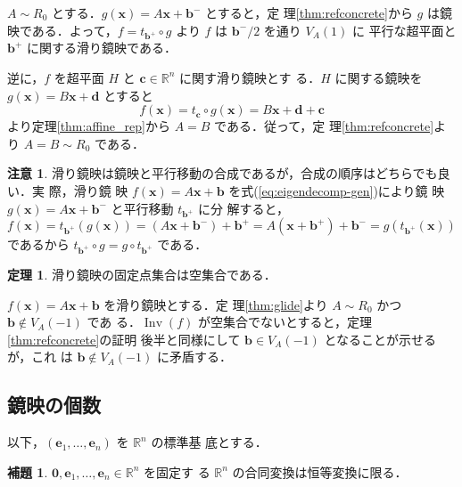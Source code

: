 \documentclass[11pt, uplatex, dvipdfmx, titlepage]{jsarticle}
\makeatletter
\DeclareMathOperator{\Inv}{Inv}
\renewenvironment{proof}[1][\proofname]{\par
  \pushQED{\qed}%
  \normalfont \topsep6\p@\@plus6\p@\relax
  \trivlist
  \item[\hskip\labelsep
         \bfseries
    {#1}]\ignorespaces
}{%
  \popQED\endtrivlist\@endpefalse
}
\theoremstyle{definition}
\newtheorem{theorem}{定理}[section]
\newtheorem{lemma}{補題}[section]
\renewcommand{\proofname}{\textbf{証明}}
\newtheorem*{remark}{注意}
\makeatother
\begin{document}
\begin{proof}
  $A \sim R_0$ とする．$g(\bm{x}) = A\bm{x} + \bm{b}^{-}$ とすると，定
  理\ref{thm:refconcrete}から $g$ は鏡映である．よって，$f =
  t_{\bm{b}^{+}} \circ g$ より $f$ は $\bm{b}^{-}/2$ を通り $V_A(1)$ に
  平行な超平面と $\bm{b}^{+}$ に関する滑り鏡映である．

  逆に，$f$ を超平面 $H$ と $\bm{c} \in \mathbb{R}^n$ に関す滑り鏡映とす
  る．$H$ に関する鏡映を $g(\bm{x}) = B\bm{x} + \bm{d}$ とすると
  \[
    f(\bm{x}) = t_{\bm{c}}\circ g(\bm{x}) = B\bm{x} + \bm{d} + \bm{c}
  \]
  より定理\ref{thm:affine_rep}から $A=B$ である．従って，定
  理\ref{thm:refconcrete}より $A =B\sim R_0$ である．
\end{proof}

\begin{remark}
  滑り鏡映は鏡映と平行移動の合成であるが，合成の順序はどちらでも良い．実
  際，滑り鏡
  映 $f(\bm{x})=A\bm{x}+\bm{b}$ を式(\ref{eq:eigendecomp-gen})により鏡
  映 $g(\bm{x}) = A\bm{x} + \bm{b}^{-}$ と平行移動 $t_{\bm{b}^{+}}$ に分
  解すると，
  \[
    f(\bm{x}) = t_{\bm{b}^{+}} \left( g(\bm{x}) \right)= \left(A\bm{x} + \bm{b}^{-}\right) + \bm{b}^{+}
    = A\left(\bm{x}+\bm{b}^{+}\right) + \bm{b}^{-} = g\left( t_{\bm{b}^{+}}(\bm{x})\right) 
  \]
  であるから $t_{\bm{b}^{+}} \circ g = g \circ t_{\bm{b}^{+}}$ である．
\end{remark}

\begin{theorem}\label{thm:inv-glide}
  滑り鏡映の固定点集合は空集合である．
\end{theorem}
\begin{proof}
  $f(\bm{x}) = A\bm{x} + \bm{b}$ を滑り鏡映とする．定
  理\ref{thm:glide}より $A \sim R_0$ かつ $\bm{b} \notin V_A(-1)$ であ
  る．$\Inv(f)$ が空集合でないとすると，定理\ref{thm:refconcrete}の証明
  後半と同様にして $\bm{b} \in V_A(-1)$ となることが示せるが，これ
  は $\bm{b} \notin V_A(-1)$ に矛盾する．
\end{proof}



\subsection{鏡映の個数}

以下，$(\bm{e}_1, \ldots, \bm{e}_n) $ を $\mathbb{R}^n$ の標準基
底とする．

\begin{lemma}\label{lem:0id}
  $\bm{0}, \bm{e}_1, \ldots, \bm{e}_n \in \mathbb{R}^n$ を固定す
  る $\mathbb{R}^n$ の合同変換は恒等変換に限る．
\end{lemma}
\end{document}
